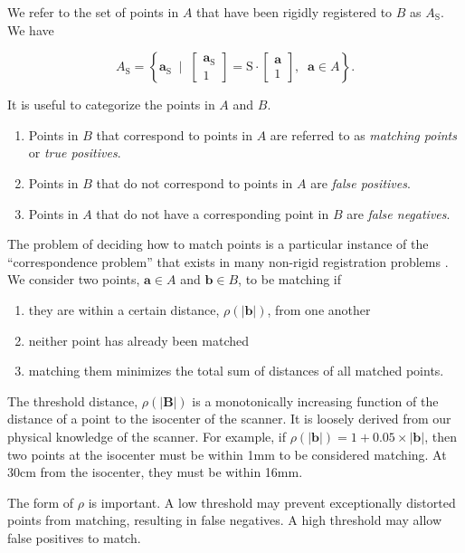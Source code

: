 \documentclass[12pt]{article}
\begin{document}
We refer to the set of points in $A$ that have been rigidly registered to $B$ as $A_\textrm{S}$.  We have

$$
A_\textrm{S} = \left\{ \mathbf{a}_\textrm{S} \;\; \Big| \;\; \begin{bmatrix} \mathbf{a}_\textrm{S} \\ 1 \end{bmatrix} = \mathrm{S} \cdot \begin{bmatrix} \mathbf{a} \\ 1 \end{bmatrix} , \;\; \mathbf{a} \in A \right\}.
$$

It is useful to categorize the points in $A$ and $B$.

\begin{enumerate}
    \item Points in $B$ that correspond to points in $A$ are referred to as \textit{matching points} or \textit{true positives}.
    \item Points in $B$ that do not correspond to points in $A$ are \textit{false positives}.
    \item Points in $A$ that do not have a corresponding point in $B$ are \textit{false negatives}.
\end{enumerate}

The problem of deciding how to match points is a particular instance of the ``correspondence problem'' that exists in many non-rigid registration problems \cite{hill2001}.  We consider two points, $\textbf{a} \in A$ and $\textbf{b} \in B$, to be matching if

\begin{enumerate}
    \item they are within a certain distance, $\rho(|\textbf{b}|)$, from one another
    \item neither point has already been matched
    \item matching them minimizes the total sum of distances of all matched points.
\end{enumerate}

The threshold distance, $\rho(|\textbf{B}|)$ is a monotonically increasing function of the distance of a point to the isocenter of the scanner.  It is loosely derived from our physical knowledge of the scanner.  For example, if $\rho(|\textbf{b}|) = 1 + 0.05 \times |\textbf{b}|$, then two points at the isocenter must be within 1mm to be considered matching. At 30cm from the isocenter, they must be within 16mm.

The form of $\rho$ is important.  A low threshold may prevent exceptionally distorted points from matching, resulting in false negatives.  A high threshold may allow false positives to match.  
\end{document}

